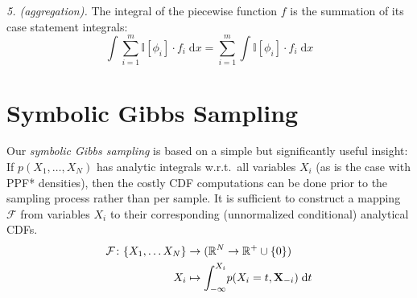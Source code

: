 \documentclass[]{article}
\newcommand{\bvec}[1]{\textbf{#1}}
\newcommand{\indicator}{\mathbb{I}}%
\newcommand{\pr}{p}
\newcommand{\dd}{\;\mathrm{d}} %
\begin{document}
\emph{5. (aggregation).}
The integral of the piecewise function $f$ is the summation of its case statement integrals:
\begin{equation*}
\int \sum_{i=1}^m \indicator[\phi_i]\cdot f_i \dd x = 
\sum_{i=1}^m \int \indicator[\phi_i] \cdot f_i \dd x
\end{equation*}


\section{Symbolic Gibbs Sampling}
\label{sect:symbolic.gibbs}

%
Our \emph{symbolic Gibbs sampling} is based on a simple but significantly useful insight:
If $\pr(X_1, \ldots, X_N)$
has analytic integrals w.r.t.\ all variables $X_i$ (as is the case with PPF* densities),
then the costly CDF computations can be done prior to the sampling process rather than per sample. 
It is sufficient to construct a mapping $\mathcal{F}$ from variables $X_i$ to their corresponding (unnormalized conditional) analytical CDFs. 
\begin{align} \footnotesize
 \mathcal{F}\colon \{X_1, \ldots X_N\} &\to (\mathbb{R}^N \to \mathbb{R}^{+} \cup \{0\}) \notag\\
 X_i &\mapsto \int_{-\infty}^{X_i} \! \pr(X_i = t , \bvec{X}_{-i}) \dd  t 
\label{e:cdf-symbolic.0}	
\end{align}
\end{document}
